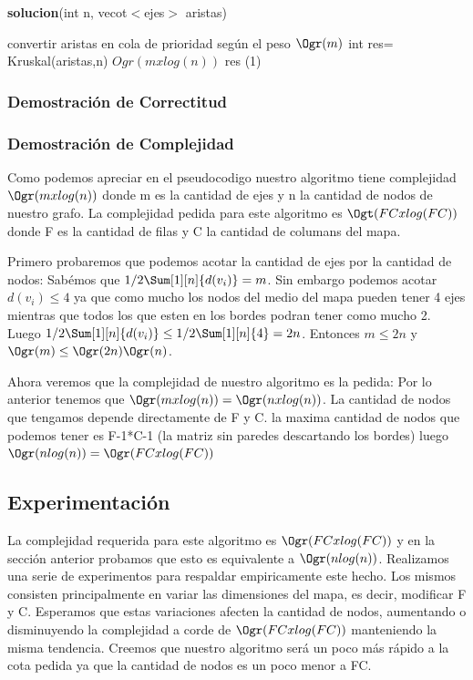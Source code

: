 \documentclass[spanish,12pt]{article}
\begin{document}
\begin{algorithm}[H]{\textbf{solucion}(int n, vecot$<$ejes$>$ aristas)}
	\begin{algorithmic}[1]
		\State convertir aristas en cola de prioridad según el peso \Comment $\Ogr(m)$
		\State int res= Kruskal(aristas,n)  \Comment $Ogr(mxlog(n))$
		\devolver res \Comment \Ogr(1)
	\end{algorithmic}
\end{algorithm}

\subsubsection{Demostración de Correctitud}


\subsubsection{Demostración de Complejidad}

Como podemos apreciar en el pseudocodigo nuestro algoritmo tiene complejidad $\Ogr(mxlog(n))$ donde m es la cantidad de ejes y n la cantidad de nodos de nuestro grafo. 
La complejidad pedida para este algoritmo es $\Ogt(FCxlog(FC))$ donde F es la cantidad de filas y C la cantidad de columans del mapa.

Primero probaremos que podemos acotar la cantidad de ejes por la cantidad de nodos:
Sabémos que $1/2  \Sum[1][n]{d(v_{i})} =m $. Sin embargo podemos acotar $d(v_{i}) \leq 4$ ya que como mucho los nodos del medio del mapa pueden tener 4 ejes mientras que todos los que esten en los bordes podran tener como mucho 2. Luego $1/2  \Sum[1][n]{d(v_{i})} \leq 1/2 \Sum[1][n]{4} = 2n$. Entonces $m \leq 2n$ y $\Ogr(m) \leq \Ogr(2n) \Ogr(n)$.

Ahora veremos que la complejidad de nuestro algoritmo es la pedida:
Por lo anterior tenemos que $\Ogr(mxlog(n))= \Ogr(nxlog(n))$.
La cantidad de nodos que tengamos depende directamente de F y C. la maxima cantidad de nodos que podemos tener es F-1*C-1 (la matriz sin paredes descartando los bordes) luego $\Ogr(nlog(n)) = \Ogr(FCxlog(FC))$ 


\subsection{Experimentación}

La complejidad requerida para este algoritmo es $\Ogr(FCxlog(FC))$ y en la sección anterior probamos que esto es equivalente a  $\Ogr(nlog(n))$.
Realizamos una serie de experimentos para respaldar empiricamente este hecho.
Los mismos consisten principalmente en variar las dimensiones del mapa, es decir, modificar F y C. Esperamos que estas variaciones afecten la cantidad de nodos, aumentando o disminuyendo la complejidad a corde de $\Ogr(FCxlog(FC))$ manteniendo la misma tendencia. 
Creemos que nuestro algoritmo será un poco más rápido a la cota pedida ya que la cantidad de nodos es un poco menor a FC.
\end{document}
